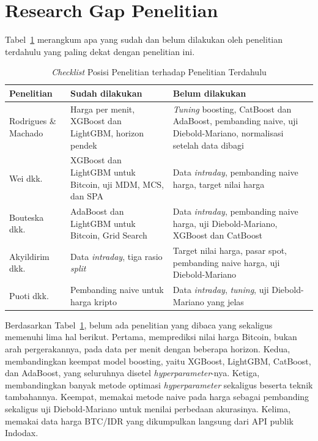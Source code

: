 \section{Research Gap Penelitian}
\label{sec:gap}
Tabel~\ref{tab:gap} merangkum apa yang sudah dan belum dilakukan oleh
penelitian terdahulu yang paling dekat dengan penelitian ini.

\begin{table}[htbp]
  \caption{\textit{Checklist} Posisi Penelitian terhadap Penelitian Terdahulu}
  \label{tab:gap}
  \centering
  \begingroup
  \footnotesize
  \setlength{\tabcolsep}{4pt}
  \begin{tabular}{|>{\raggedright\arraybackslash}p{}%
                  |>{\raggedright\arraybackslash}p{}%
                  |>{\raggedright\arraybackslash}p{}|}
    \hline
    \textbf{Penelitian} & \textbf{Sudah dilakukan} & \textbf{Belum dilakukan} \\
    \hline
    Rodrigues \& Machado \cite{rodrigues2025} &
    Harga per menit, XGBoost dan LightGBM, horizon pendek &
    \textit{Tuning} boosting, CatBoost dan AdaBoost, pembanding naive, uji
    Diebold-Mariano, normalisasi setelah data dibagi \\
    \hline
    Wei dkk. \cite{wei2023} &
    XGBoost dan LightGBM untuk Bitcoin, uji MDM, MCS, dan SPA &
    Data \textit{intraday}, pembanding naive harga, target nilai harga \\
    \hline
    Bouteska dkk. \cite{bouteska2024} &
    AdaBoost dan LightGBM untuk Bitcoin, Grid Search &
    Data \textit{intraday}, pembanding naive harga, uji Diebold-Mariano, XGBoost dan
    CatBoost \\
    \hline
    Akyildirim dkk. \cite{akyildirim2023} &
    Data \textit{intraday}, tiga rasio \textit{split} &
    Target nilai harga, pasar spot, pembanding naive harga, uji
    Diebold-Mariano \\
    \hline
    Puoti dkk. \cite{puoti2024} &
    Pembanding naive untuk harga kripto &
    Data \textit{intraday}, \textit{tuning}, uji Diebold-Mariano yang jelas \\
    \hline
  \end{tabular}
  \endgroup
\end{table}

Berdasarkan Tabel~\ref{tab:gap}, belum ada penelitian yang dibaca yang sekaligus memenuhi lima hal berikut. Pertama, memprediksi nilai harga Bitcoin, bukan
arah pergerakannya, pada data per menit dengan beberapa horizon. Kedua,
membandingkan keempat model boosting, yaitu XGBoost, LightGBM, CatBoost, dan
AdaBoost, yang seluruhnya disetel \textit{hyperparameter}-nya. Ketiga,
membandingkan banyak metode optimasi \textit{hyperparameter} sekaligus beserta
teknik tambahannya. Keempat, memakai metode naive pada harga sebagai pembanding
sekaligus uji Diebold-Mariano untuk menilai perbedaan akurasinya. Kelima,
memakai data harga BTC/IDR yang dikumpulkan langsung dari API publik
Indodax.

